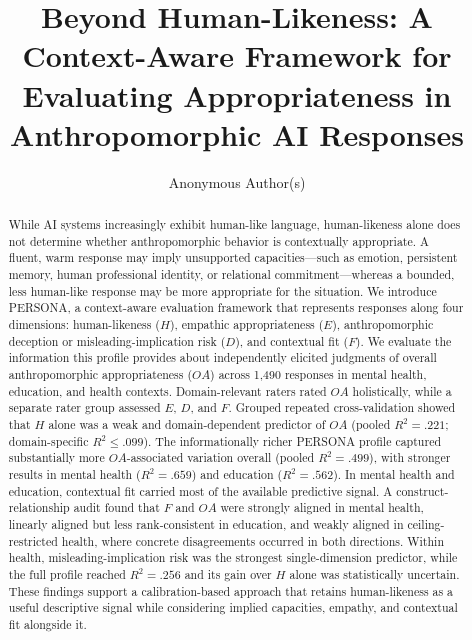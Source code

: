 \documentclass[manuscript,review,anonymous]{acmart}
\title{Beyond Human-Likeness: A Context-Aware Framework for Evaluating Appropriateness in Anthropomorphic AI Responses}
\author{Anonymous Author(s)}
\affiliation{%
  \institution{Anonymous Institution}
  \country{}}
\begin{document}
\begin{abstract}
While AI systems increasingly exhibit human-like language, human-likeness alone does not determine whether anthropomorphic behavior is contextually appropriate. A fluent, warm response may imply unsupported capacities---such as emotion, persistent memory, human professional identity, or relational commitment---whereas a bounded, less human-like response may be more appropriate for the situation. We introduce PERSONA, a context-aware evaluation framework that represents responses along four dimensions: human-likeness ($H$), empathic appropriateness ($E$), anthropomorphic deception or misleading-implication risk ($D$), and contextual fit ($F$). We evaluate the information this profile provides about independently elicited judgments of overall anthropomorphic appropriateness ($OA$) across 1,490 responses in mental health, education, and health contexts. Domain-relevant raters rated $OA$ holistically, while a separate rater group assessed $E$, $D$, and $F$. Grouped repeated cross-validation showed that $H$ alone was a weak and domain-dependent predictor of $OA$ (pooled $R^2=.221$; domain-specific $R^2\leq.099$). The informationally richer PERSONA profile captured substantially more $OA$-associated variation overall (pooled $R^2=.499$), with stronger results in mental health ($R^2=.659$) and education ($R^2=.562$). In mental health and education, contextual fit carried most of the available predictive signal. A construct-relationship audit found that $F$ and $OA$ were strongly aligned in mental health, linearly aligned but less rank-consistent in education, and weakly aligned in ceiling-restricted health, where concrete disagreements occurred in both directions. Within health, misleading-implication risk was the strongest single-dimension predictor, while the full profile reached $R^2=.256$ and its gain over $H$ alone was statistically uncertain. These findings support a calibration-based approach that retains human-likeness as a useful descriptive signal while considering implied capacities, empathy, and contextual fit alongside it.
\end{abstract}


\maketitle
\end{document}
